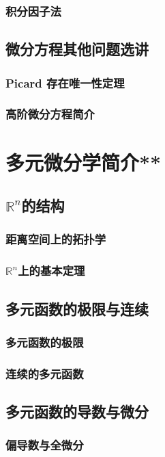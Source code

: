 \subsection{积分因子法}

\clearpage
\section{微分方程其他问题选讲}
\subsection{Picard 存在唯一性定理}
\clearpage
\subsection{高阶微分方程简介}

\clearpage
\chapter{多元微分学简介**}
\section{\texorpdfstring{$\mathbb{R}^n$}n的结构}
\subsection{距离空间上的拓扑学}
\clearpage
\subsection{\texorpdfstring{$\mathbb{R}^n$}n上的基本定理}

\clearpage
\section{多元函数的极限与连续}
\subsection{多元函数的极限}
\clearpage
\subsection{连续的多元函数}
\clearpage

\section{多元函数的导数与微分}
\subsection{偏导数与全微分}
\clearpage
